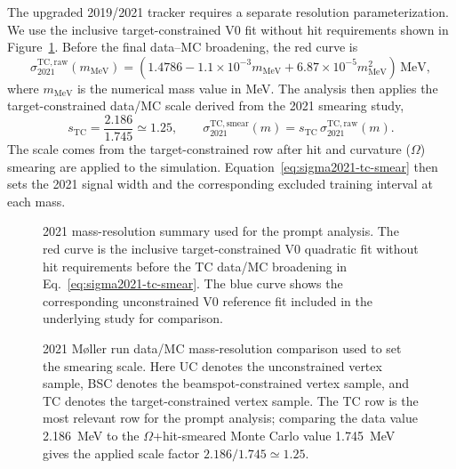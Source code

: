 The upgraded 2019/2021 tracker requires a separate resolution parameterization. We use
the inclusive target-constrained V0 fit without hit requirements shown in
Figure~\ref{fig:2021-resolution}. Before the final data--MC broadening, the red curve is
\begin{equation}
\sigma_{2021}^{\mathrm{TC,raw}}(m_{\mathrm{MeV}})
= \left(1.4786 - 1.1\times10^{-3}m_{\mathrm{MeV}}
  + 6.87\times10^{-5}m_{\mathrm{MeV}}^2\right)\,\mathrm{MeV},
\label{eq:sigma2021}
\end{equation}
where $m_{\mathrm{MeV}}$ is the numerical mass value in MeV. The analysis then applies the
target-constrained data/MC scale derived from the 2021 smearing study,
\begin{equation}
s_{\mathrm{TC}} = \frac{2.186}{1.745} \simeq 1.25,
\qquad
\sigma_{2021}^{\mathrm{TC,smear}}(m)
= s_{\mathrm{TC}}\,\sigma_{2021}^{\mathrm{TC,raw}}(m).
\label{eq:sigma2021-tc-smear}
\end{equation}
The scale comes from the target-constrained row after hit and curvature ($\Omega$)
smearing are applied to the simulation. Equation~\ref{eq:sigma2021-tc-smear} then sets
the 2021 signal width and the corresponding excluded training interval at each mass.

\begin{figure}[H]
\centering
{}
\caption{2021 mass-resolution summary used for the prompt analysis. The red curve is
the inclusive target-constrained V0 quadratic fit without hit requirements before the
TC data/MC broadening in Eq.~\ref{eq:sigma2021-tc-smear}. The blue curve shows the
corresponding unconstrained V0 reference fit included in the underlying study for
comparison.}
\label{fig:2021-resolution}
\end{figure}

\begin{figure}[H]
\centering
{}
\caption{2021 M{\o}ller run data/MC mass-resolution comparison used to set the
smearing scale.
Here UC denotes the unconstrained vertex sample, BSC denotes the beamspot-constrained
vertex sample, and TC denotes the target-constrained vertex sample. The TC row is the
most relevant row for the prompt analysis; comparing the data value
\SI{2.186}{MeV} to the $\Omega$+hit-smeared Monte Carlo value \SI{1.745}{MeV}
gives the applied scale factor $2.186/1.745\simeq1.25$.}
\label{fig:2021-data-mc-smearing-scale}
\end{figure}

